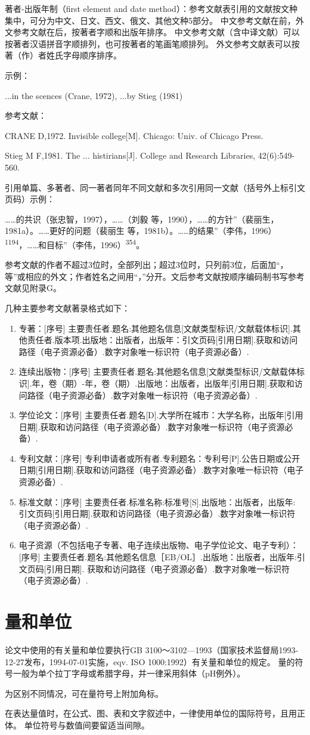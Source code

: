 著者-出版年制（first element and date method）：参考文献表引用的文献按文种集中，可分为中文、日文、西文、俄文、其他文种5部分。
中文参考文献在前，外文参考文献在后，按著者字顺和出版年排序。
中文参考文献（含中译文献）可以按著者汉语拼音字顺排列，也可按著者的笔画笔顺排列。
外文参考文献表可以按著（作）者姓氏字母顺序排序。

示例：

...in the scences (Crane, 1972), ...by Stieg (1981)

参考文献：

CRANE D,1972. Invisible college[M]. Chicago: Univ. of Chicago Press.

Stieg M F,1981. The ... histirians[J]. College and Research Libraries, 42(6):549-560.

引用单篇、多著者、同一著者同年不同文献和多次引用同一文献（括号外上标引文页码）示例：

……的共识（张忠智，1997），……（刘毅 等，1990），……的方针”（裴丽生，1981a）。……更好的问题（裴丽生 等，1981b）。……的结果”（李伟，1996）\textsuperscript{1194}，……和目标”（李伟，1996）\textsuperscript{354}。

参考文献的作者不超过3位时，全部列出；超过3位时，只列前3位，后面加“，等”或相应的外文；作者姓名之间用“，”分开。文后参考文献按顺序编码制书写参考文献见附录G。

几种主要参考文献著录格式如下：

\begin{enumerate}
    \item 专著：[序号] 主要责任者.题名:其他题名信息[文献类型标识/文献载体标识].其他责任者.版本项.出版地：出版者，出版年：引文页码[引用日期].获取和访问路径（电子资源必备）.数字对象唯一标识符（电子资源必备）.
    \item 连续出版物：[序号] 主要责任者.题名:其他题名信息[文献类型标识/文献载体标识].年，卷（期）-年，卷（期）.出版地：出版者，出版年[引用日期].获取和访问路径（电子资源必备）.数字对象唯一标识符（电子资源必备）.
    \item 学位论文：[序号] 主要责任者.题名[D].大学所在城市：大学名称，出版年[引用日期].获取和访问路径（电子资源必备）.数字对象唯一标识符（电子资源必备）.
    \item 专利文献：[序号] 专利申请者或所有者.专利题名：专利号[P].公告日期或公开日期[引用日期].获取和访问路径（电子资源必备）.数字对象唯一标识符（电子资源必备）.
    \item 标准文献：[序号] 主要责任者.标准名称:标准号[S].出版地：出版者，出版年: 引文页码[引用日期].获取和访问路径（电子资源必备）.数字对象唯一标识符（电子资源必备）.
    \item 电子资源（不包括电子专著、电子连续出版物、电子学位论文、电子专利）：[序号] 主要责任者.题名:其他题名信息［EB/OL］.出版地：出版者，出版年:引文页码[引用日期]. 获取和访问路径（电子资源必备）.数字对象唯一标识符（电子资源必备）.
\end{enumerate}

\section{量和单位}

论文中使用的有关量和单位要执行GB 3100～3102—1993（国家技术监督局1993-12-27发布，1994-07-01实施，eqv. ISO 1000:1992）有关量和单位的规定。
量的符号一般为单个拉丁字母或希腊字母，并一律采用斜体（pH例外）。

为区别不同情况，可在量符号上附加角标。

在表达量值时，在公式、图、表和文字叙述中，一律使用单位的国际符号，且用正体。
单位符号与数值间要留适当间隙。
